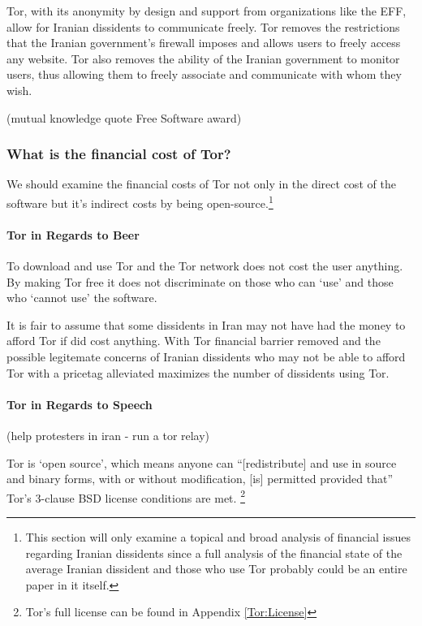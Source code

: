 \documentclass[11pt]{article}
\begin{document}
\begin{multicols}{2}
Tor, with its anonymity by design and support from organizations like the EFF,
allow for Iranian dissidents to communicate freely. Tor removes the restrictions
that the Iranian government's firewall imposes and allows users to freely access
any website. Tor also removes the ability of the Iranian government to monitor
users, thus allowing them to freely associate and communicate with whom they
wish. 

(mutual knowledge quote Free Software award)

\subsubsection{What is the financial cost of Tor?}

We should examine the financial costs of Tor not only in the direct cost of the
software but it's indirect costs by being open-source.\footnote{This section
  will only examine a topical and broad analysis of financial issues regarding
  Iranian dissidents since a full analysis of the financial state of the average
Iranian dissident and those who use Tor probably could be an entire paper in it
itself.}

\paragraph{Tor in Regards to Beer}

To download and use Tor and the Tor network does not cost the user anything. By
making Tor free it does not discriminate on those who can `use' and those who
`cannot use' the software. 

It is fair to assume that some dissidents in Iran may not have had the money to
afford Tor if did cost anything. With Tor financial barrier removed and the
possible legitemate concerns of Iranian dissidents who may not be able to afford
Tor with a pricetag alleviated maximizes the number of dissidents using Tor.

\paragraph{Tor in Regards to Speech}
(help protesters in iran - run a tor relay)

Tor is `open source', which means anyone can ``[redistribute] and use in source
and binary forms, with or without modification, [is] permitted provided that''
Tor's 3-clause BSD license conditions are met. \footnote{Tor's full license can
be found in Appendix \ref{Tor:License}} \cite{BSD:3-ClauseLicense,
TOR:Download, TOR:BSD-License} 


\end{multicols}
\end{document}
